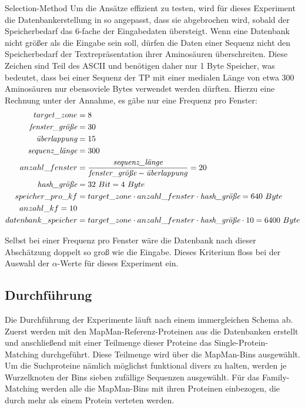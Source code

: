 \begin{experiment}{Selection-Method}
        Um die Ansätze effizient zu testen, wird für dieses Experiment die Datenbankerstellung in  so angepasst, dass sie abgebrochen wird, sobald der Speicherbedarf das 6-fache der Eingabedaten übersteigt. Wenn eine Datenbank nicht größer als die Eingabe sein soll, dürfen die Daten einer Sequenz nicht den Speicherbedarf der Textrepräsentation ihrer Aminosäuren überschreiten. Diese Zeichen sind Teil des \ac{ASCII} und benötigen daher nur 1 Byte Speicher, was bedeutet, dass bei einer Sequenz der \ac{TP} mit einer medialen Länge von etwa 300 Aminosäuren nur ebensoviele Bytes verwendet werden dürften. Hierzu eine Rechnung unter der Annahme, es gäbe nur eine Frequenz pro Fenster:
        \begin{equation}
            \begin{split}
                target\_zone &= 8\\
                \emph{fenster\_größe} &= 30\\
                \emph{überlappung} &= 15\\
                \emph{sequenz\_länge} &= 300\\
                anzahl\_fenster &= \frac{\emph{sequenz\_länge}}{\emph{fenster\_größe} - \emph{überlappung}} = 20\\
                \emph{hash\_größe} &= 32\ Bit = 4\ Byte\\
                speicher\_pro\_kf &= target\_zone \cdot anzahl\_fenster \cdot \emph{hash\_größe} = 640\ Byte\\
                anzahl\_kf = 10\\
                datenbank\_speicher &= target\_zone \cdot anzahl\_fenster \cdot \emph{hash\_größe} \cdot 10 = 6400\ Byte
            \end{split}
        \end{equation}

        Selbst bei einer Frequenz pro Fenster wäre die Datenbank nach dieser Abschätzung doppelt so groß wie die Eingabe. Dieses Kriterium floss bei der Auswahl der $\alpha$-Werte für dieses Experiment ein.
    \end{experiment}
    \subsection{Durchführung} %
        \label{sub:durchführung}
        Die Durchführung der Experimente läuft nach einem immergleichen Schema ab. Zuerst werden mit den MapMan-Referenz-Proteinen aus  die Datenbanken erstellt und anschließend mit einer Teilmenge dieser Proteine das Single-Protein-Matching durchgeführt. Diese Teilmenge wird über die MapMan-Bins ausgewählt. Um die Suchproteine nämlich möglichst funktional divers zu halten, werden je Wurzelknoten der Bins sieben zufällige Sequenzen ausgewählt. Für das Family-Matching werden alle die MapMan-Bins mit ihren Proteinen einbezogen, die durch mehr als einem Protein verteten werden.

